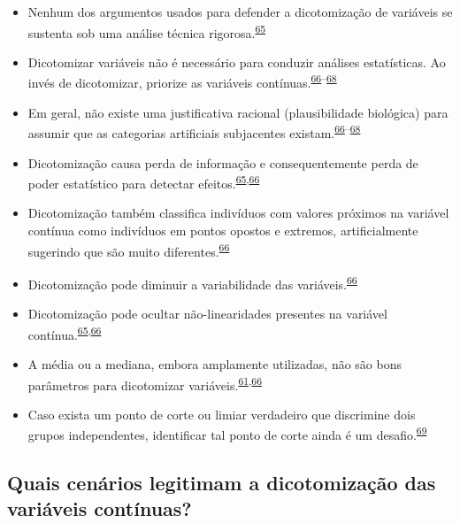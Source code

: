 \documentclass[
  a4paper,
]{book}
\begin{document}
\begin{itemize}
\item
  Nenhum dos argumentos usados para defender a dicotomização de variáveis se sustenta sob uma análise técnica rigorosa.\textsuperscript{\protect\hyperlink{ref-MacCallum2002}{65}}
\item
  Dicotomizar variáveis não é necessário para conduzir análises estatísticas. Ao invés de dicotomizar, priorize as variáveis contínuas.\textsuperscript{\protect\hyperlink{ref-Altman2006}{66}--\protect\hyperlink{ref-Collins2016}{68}}
\item
  Em geral, não existe uma justificativa racional (plausibilidade biológica) para assumir que as categorias artificiais subjacentes existam.\textsuperscript{\protect\hyperlink{ref-Altman2006}{66}--\protect\hyperlink{ref-Collins2016}{68}}
\item
  Dicotomização causa perda de informação e consequentemente perda de poder estatístico para detectar efeitos.\textsuperscript{\protect\hyperlink{ref-MacCallum2002}{65},\protect\hyperlink{ref-Altman2006}{66}}
\item
  Dicotomização também classifica indivíduos com valores próximos na variável contínua como indivíduos em pontos opostos e extremos, artificialmente sugerindo que são muito diferentes.\textsuperscript{\protect\hyperlink{ref-Altman2006}{66}}
\item
  Dicotomização pode diminuir a variabilidade das variáveis.\textsuperscript{\protect\hyperlink{ref-Altman2006}{66}}
\item
  Dicotomização pode ocultar não-linearidades presentes na variável contínua.\textsuperscript{\protect\hyperlink{ref-MacCallum2002}{65},\protect\hyperlink{ref-Altman2006}{66}}
\item
  A média ou a mediana, embora amplamente utilizadas, não são bons parâmetros para dicotomizar variáveis.\textsuperscript{\protect\hyperlink{ref-Fedorov2009}{61},\protect\hyperlink{ref-Altman2006}{66}}
\item
  Caso exista um ponto de corte ou limiar verdadeiro que discrimine dois grupos independentes, identificar tal ponto de corte ainda é um desafio.\textsuperscript{\protect\hyperlink{ref-Prince2017}{69}}
\end{itemize}

\hypertarget{quais-cenuxe1rios-legitimam-a-dicotomizauxe7uxe3o-das-variuxe1veis-contuxednuas}{%
\subsection{Quais cenários legitimam a dicotomização das variáveis contínuas?}\label{quais-cenuxe1rios-legitimam-a-dicotomizauxe7uxe3o-das-variuxe1veis-contuxednuas}}
\end{document}
